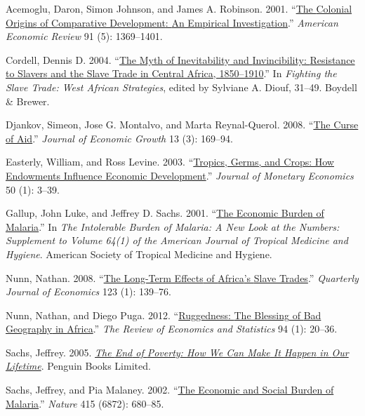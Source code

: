 \documentclass[
  letterpaper,
  DIV=11,
  numbers=noendperiod]{scrartcl}
\newlength{\cslhangindent}
\newenvironment{CSLReferences}[2] %
 {\begin{list}{}{%
  \setlength{\itemindent}{0pt}
  \setlength{\leftmargin}{0pt}
  \setlength{\parsep}{0pt}
  \ifodd #1
   \setlength{\leftmargin}{\cslhangindent}
   \setlength{\itemindent}{-1\cslhangindent}
  \fi
  \setlength{\itemsep}{#2\baselineskip}}}
 {\end{list}}
\begin{document}
\protect{}\label{refs}
\begin{CSLReferences}{1}{0}
Acemoglu, Daron, Simon Johnson, and James A. Robinson. 2001.
{``\href{https://doi.org/10.1257/aer.91.5.1369}{The {Colonial Origins}
of {Comparative Development}: {An Empirical Investigation}}.''}
\emph{American Economic Review} 91 (5): 1369--1401.

Cordell, Dennis D. 2004.
{``\href{https://www.cambridge.org/core/books/fighting-the-slave-trade/myth-of-inevitability-and-invincibility-resistance-to-slavers-and-the-slave-trade-in-central-africa-18501910/E2E9819E2BBD9A958F4BB7CDC505764C}{The
{Myth} of {Inevitability} and {Invincibility}: {Resistance} to {Slavers}
and the {Slave Trade} in {Central Africa}, 1850--1910}.''} In
\emph{Fighting the {Slave Trade}: {West African Strategies}}, edited by
Sylviane A. Diouf, 31--49. Boydell \& Brewer.

Djankov, Simeon, Jose G. Montalvo, and Marta Reynal-Querol. 2008.
{``\href{https://doi.org/10.1007/s10887-008-9032-8}{The Curse of
Aid}.''} \emph{Journal of Economic Growth} 13 (3): 169--94.

Easterly, William, and Ross Levine. 2003.
{``\href{https://doi.org/10.1016/S0304-3932(02)00200-3}{Tropics, Germs,
and Crops: How Endowments Influence Economic Development}.''}
\emph{Journal of Monetary Economics} 50 (1): 3--39.

Gallup, John Luke, and Jeffrey D. Sachs. 2001.
{``\href{https://www.ncbi.nlm.nih.gov/books/NBK2624/}{The {Economic
Burden} of {Malaria}}.''} In \emph{The {Intolerable Burden} of
{Malaria}: {A New Look} at the {Numbers}: {Supplement} to {Volume} 64(1)
of the {American Journal} of {Tropical Medicine} and {Hygiene}}.
{American Society of Tropical Medicine and Hygiene}.

Nunn, Nathan. 2008.
{``\href{https://doi.org/10.1162/qjec.2008.123.1.139}{The {Long-Term
Effects} of {Africa}'s {Slave Trades}}.''} \emph{Quarterly Journal of
Economics} 123 (1): 139--76.

Nunn, Nathan, and Diego Puga. 2012.
{``\href{https://www.jstor.org/stable/41349158}{Ruggedness: {The
Blessing} of {Bad Geography} in {Africa}}.''} \emph{The Review of
Economics and Statistics} 94 (1): 20--36.

Sachs, Jeffrey. 2005.
\emph{\href{https://books.google.com?id=uzhveDZnv_gC}{The {End} of
{Poverty}: {How We Can Make} It {Happen} in {Our Lifetime}}}. Penguin
Books Limited.

Sachs, Jeffrey, and Pia Malaney. 2002.
{``\href{https://doi.org/10.1038/415680a}{The Economic and Social Burden
of Malaria}.''} \emph{Nature} 415 (6872): 680--85.

\end{CSLReferences}
\end{document}
